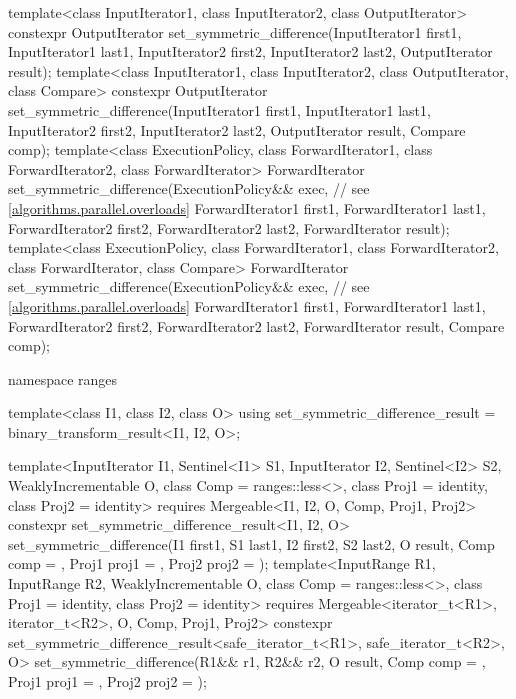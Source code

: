 \begin{codeblock}
{  template<class InputIterator1, class InputIterator2, class OutputIterator>
    constexpr OutputIterator
      set_symmetric_difference(InputIterator1 first1, InputIterator1 last1,
                               InputIterator2 first2, InputIterator2 last2,
                               OutputIterator result);
  template<class InputIterator1, class InputIterator2, class OutputIterator, class Compare>
    constexpr OutputIterator
      set_symmetric_difference(InputIterator1 first1, InputIterator1 last1,
                               InputIterator2 first2, InputIterator2 last2,
                               OutputIterator result, Compare comp);
  template<class ExecutionPolicy, class ForwardIterator1, class ForwardIterator2,
           class ForwardIterator>
    ForwardIterator
      set_symmetric_difference(ExecutionPolicy&& exec, // see \ref{algorithms.parallel.overloads}
                               ForwardIterator1 first1, ForwardIterator1 last1,
                               ForwardIterator2 first2, ForwardIterator2 last2,
                               ForwardIterator result);
  template<class ExecutionPolicy, class ForwardIterator1, class ForwardIterator2,
           class ForwardIterator, class Compare>
    ForwardIterator
      set_symmetric_difference(ExecutionPolicy&& exec, // see \ref{algorithms.parallel.overloads}
                               ForwardIterator1 first1, ForwardIterator1 last1,
                               ForwardIterator2 first2, ForwardIterator2 last2,
                               ForwardIterator result, Compare comp);

  namespace ranges {
    template<class I1, class I2, class O>
    using set_symmetric_difference_result = binary_transform_result<I1, I2, O>;

    template<InputIterator I1, Sentinel<I1> S1, InputIterator I2, Sentinel<I2> S2,
             WeaklyIncrementable O, class Comp = ranges::less<>,
             class Proj1 = identity, class Proj2 = identity>
      requires Mergeable<I1, I2, O, Comp, Proj1, Proj2>
      constexpr set_symmetric_difference_result<I1, I2, O>
        set_symmetric_difference(I1 first1, S1 last1, I2 first2, S2 last2, O result,
                                 Comp comp = {}, Proj1 proj1 = {},
                                 Proj2 proj2 = {});
    template<InputRange R1, InputRange R2, WeaklyIncrementable O,
             class Comp = ranges::less<>, class Proj1 = identity, class Proj2 = identity>
      requires Mergeable<iterator_t<R1>, iterator_t<R2>, O, Comp, Proj1, Proj2>
      constexpr set_symmetric_difference_result<safe_iterator_t<R1>, safe_iterator_t<R2>, O>
        set_symmetric_difference(R1&& r1, R2&& r2, O result, Comp comp = {},
                                 Proj1 proj1 = {}, Proj2 proj2 = {});
  }

}
\end{codeblock}
